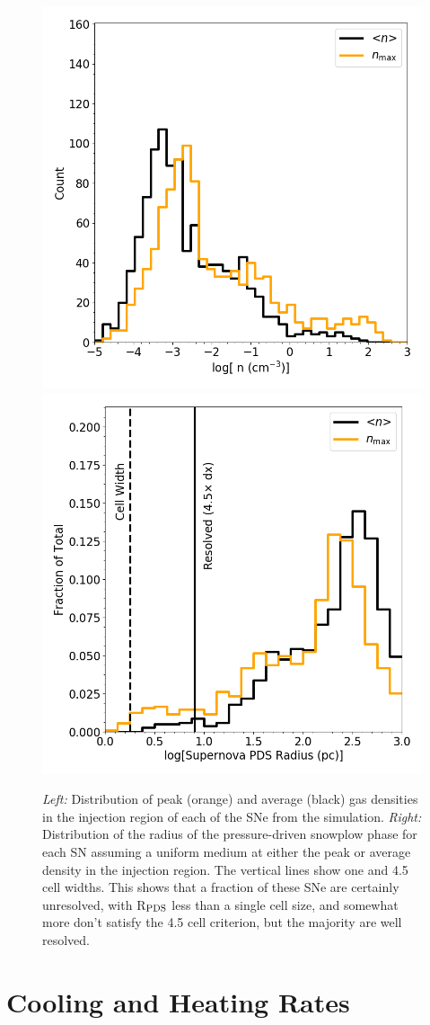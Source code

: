 \begin{figure}
\centering
\includegraphics[width=0.4\linewidth]{figures/ch1/sn_density_hist}
\includegraphics[width=0.4\linewidth]{figures/ch1/sn_radius_hist}
\caption{{\em Left:} Distribution of peak (orange) and average (black) gas densities in the injection region of each of the SNe from the simulation. {\em Right:} Distribution of the radius of the pressure-driven snowplow phase for each SN assuming a uniform medium at either the peak or average density in the injection region. The vertical lines show one and 4.5 cell widths. This shows that a fraction of these SNe are certainly unresolved, with R$_{\rm PDS}$ less than a single cell size, and somewhat more don't satisfy the 4.5 cell criterion, but the majority are well resolved.}
\label{ch1:fig:SN histogram}
\end{figure}

\setcounter{figure}{0}
\section{Cooling and Heating Rates}
\label{appendix:cooling}

